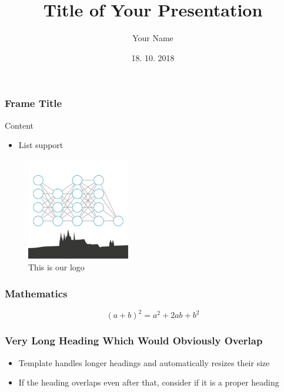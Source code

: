\documentclass{beamer}
\title[Short Title]{Title of Your Presentation}
\author{Your Name}
\date{18. 10. 2018}
\begin{document}

\begin{frame}
  \frametitle{Frame Title}

  Content

  \begin{itemize}
    \item List support
  \end{itemize}

  \begin{figure}
      \includegraphics[width=0.4\textwidth]{logo}
      \caption{This is our logo}
      \label{fig:logo}
  \end{figure}

\end{frame}

\begin{frame}
  \frametitle{Mathematics}

  \begin{equation*}
    (a + b)^2 = a^2 + 2ab + b^2
  \end{equation*}

\end{frame}

%
%
%
%

\begin{frame}
  \frametitle{Very Long Heading Which Would Obviously Overlap}

  \begin{itemize}
    \item Template handles longer headings and automatically resizes their size
    \item If the heading overlaps even after that, consider if it is a proper heading
  \end{itemize}

\end{frame}
\end{document}
